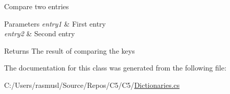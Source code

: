Compare two entries 


\begin{DoxyParams}{Parameters}
{\em entry1} & First entry\\
\hline
{\em entry2} & Second entry\\
\hline
\end{DoxyParams}
\begin{DoxyReturn}{Returns}
The result of comparing the keys
\end{DoxyReturn}


The documentation for this class was generated from the following file\+:\begin{DoxyCompactItemize}
\item 
C\+:/\+Users/rasmusl/\+Source/\+Repos/\+C5/\+C5/\hyperlink{_dictionaries_8cs}{Dictionaries.\+cs}\end{DoxyCompactItemize}
